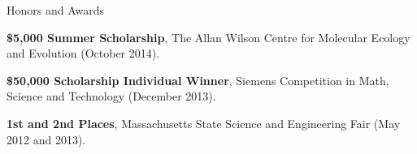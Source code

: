 \documentclass[11pt]{tracv}
\begin{document}
    \begin{hangingsection}{Honors and Awards}

        \hangingentry \textbf{\$5,000 Summer Scholarship}, The Allan Wilson Centre for Molecular Ecology and Evolution (October 2014).

        \hangingentry \textbf{\$50,000 Scholarship Individual Winner}, Siemens Competition in Math, Science and Technology (December 2013).

        \hangingentry \textbf{1st and 2nd Places}, Massachusetts State Science and Engineering Fair (May 2012 and 2013).

    \end{hangingsection}
\end{document}
